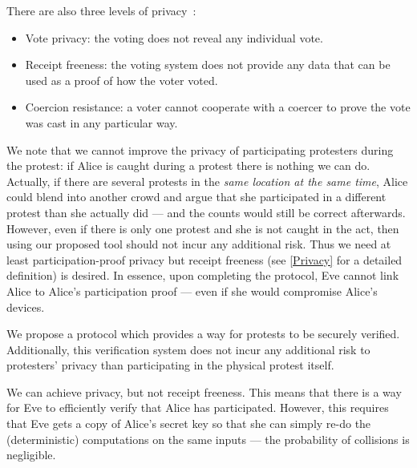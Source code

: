 
There are also three levels of 
privacy~\cite{VerifyingPrivacyPropertiesOfVotingProtocols}:
\begin{itemize}
  \item\label{VotePrivacy} Vote privacy: the voting does not reveal any 
    individual vote.
  \item\label{ReceiptFreeness} Receipt freeness: the voting system does not 
    provide any data that can be used as a proof of how the voter voted.
  \item\label{CoercionResistance} Coercion resistance: a voter cannot cooperate 
    with a coercer to prove the vote was cast in any particular way.
\end{itemize}
We note that we cannot improve the privacy of participating protesters during 
the protest: if Alice is caught during a protest there is nothing we can do.
Actually, if there are several protests in the \emph{same location at the same 
  time}, Alice could blend into another crowd and argue that she participated in 
a different protest than she actually did --- and the counts would still be 
correct afterwards.
However, even if there is only one protest and she is not caught in the act, 
then using our proposed tool should not incur any additional risk.
Thus we need at least participation-proof privacy but receipt freeness (see 
\cref{Privacy} for a detailed definition) is desired.
In essence, upon completing the protocol, Eve cannot link Alice to Alice's 
participation proof --- even if she would compromise Alice's devices.


We propose a protocol which provides a way for protests to be securely verified.
Additionally, this verification system does not incur any additional risk to 
protesters' privacy than participating in the physical protest itself.

We can achieve privacy, but not receipt freeness.
This means that there is a way for Eve to efficiently verify that Alice has 
participated.
However, this requires that Eve gets a copy of Alice's secret key so that she 
can simply re-do the (deterministic) computations on the same inputs --- the 
probability of collisions is negligible.

